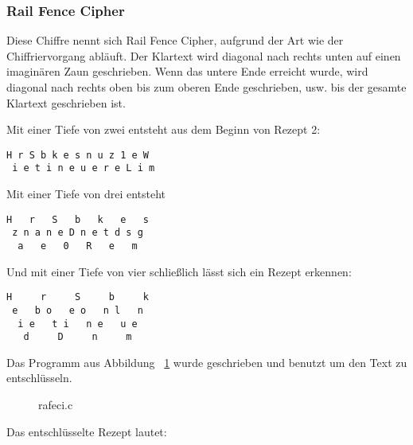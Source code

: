 \subsubsection*{Rail Fence Cipher}

Diese Chiffre nennt sich Rail Fence Cipher, aufgrund der Art wie der
Chiffriervorgang abläuft. Der Klartext wird diagonal nach rechts unten auf einen
imaginären Zaun geschrieben. Wenn das untere Ende erreicht wurde, wird diagonal
nach rechts oben bis zum oberen Ende geschrieben, usw. bis der gesamte Klartext
geschrieben ist.

Mit einer Tiefe von zwei entsteht aus dem Beginn von Rezept 2:

\begin{lstlisting}
H r S b k e s n u z 1 e W
 i e t i n e u e r e L i m
\end{lstlisting}

Mit einer Tiefe von drei entsteht

\begin{lstlisting}
H   r   S   b   k   e   s
 z n a n e D n e t d s g
  a   e   0   R   e   m
\end{lstlisting}
Und mit einer Tiefe von vier schließlich lässt sich ein Rezept erkennen:
\begin{lstlisting}
H     r     S     b     k
 e   b o   e o   n l   n
  i e   t i   n e   u e
   d     D     n     m
\end{lstlisting}

Das Programm aus Abbildung ~\ref{fig:rafeci} wurde geschrieben und benutzt um den Text zu
entschlüsseln.

\begin{figure}[p]

\caption{rafeci.c}
\label{fig:rafeci}
\end{figure}

Das entschlüsselte Rezept lautet:

{\tiny

}
